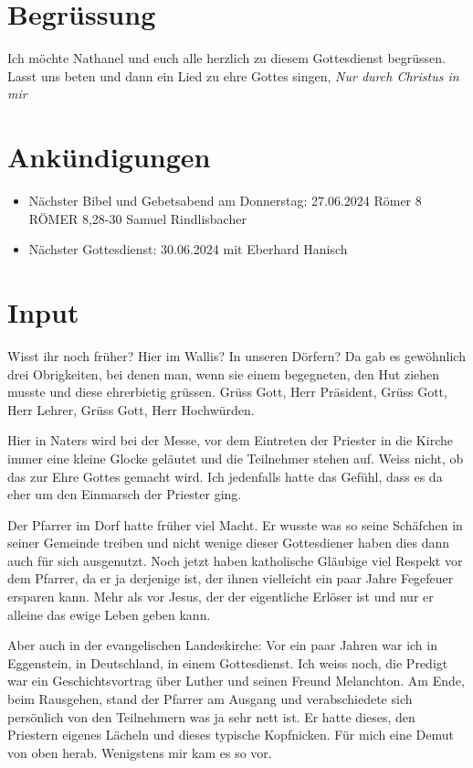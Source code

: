 
\section{Begrüssung}
Ich möchte Nathanel und euch alle herzlich zu diesem Gottesdienst begrüssen.
\\
Lasst uns beten und dann ein Lied zu ehre Gottes singen, \textit{Nur durch Christus in mir}

\section{Ankündigungen}
\begin{itemize}
    \item Nächster Bibel und Gebetsabend am Donnerstag:
    27.06.2024 Römer 8 
    RÖMER 8,28-30    Samuel Rindlisbacher
    \item Nächster Gottesdienst: 30.06.2024 mit Eberhard Hanisch
\end{itemize}

\section{ Input }
Wisst ihr noch früher? Hier im Wallis? In unseren Dörfern? Da gab es gewöhnlich drei Obrigkeiten, bei denen man, wenn sie einem begegneten, den Hut ziehen musste und diese ehrerbietig grüssen. \glqq Grüss Gott, Herr Präsident\grqq{}, \glqq Grüss Gott, Herr Lehrer\glqq{}, \grqq Grüss Gott, Herr Hochwürden\glqq{}.

Hier in Naters  wird bei der Messe, vor dem Eintreten der Priester in die Kirche immer eine kleine Glocke geläutet und die Teilnehmer stehen auf. Weiss nicht, ob das zur Ehre Gottes gemacht wird. Ich jedenfalls hatte das Gefühl, dass es da eher um den Einmarsch der Priester ging.

Der Pfarrer im Dorf hatte früher viel Macht. Er wusste was so seine Schäfchen in seiner Gemeinde treiben und nicht wenige dieser Gottesdiener haben dies dann auch für sich ausgenutzt. Noch jetzt haben katholische Gläubige viel Respekt vor dem Pfarrer, da er ja derjenige ist, der ihnen vielleicht ein paar Jahre Fegefeuer ersparen kann. Mehr als vor Jesus, der der eigentliche Erlöser ist und nur er alleine das ewige Leben geben kann.

Aber auch in der evangelischen Landeskirche: Vor ein paar Jahren war ich in Eggenstein, in Deutschland, in einem Gottesdienst. Ich weiss noch, die Predigt war ein Geschichtsvortrag über Luther und seinen Freund Melanchton. Am Ende, beim Rausgehen, stand der Pfarrer am Ausgang und verabschiedete sich persönlich von den Teilnehmern was ja sehr nett ist. Er hatte dieses, den Priestern eigenes Lächeln und dieses typische Kopfnicken. Für mich eine Demut von oben herab. Wenigstens mir kam es so vor.

